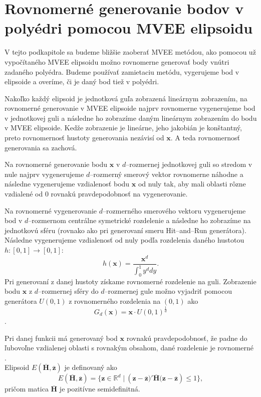 \section {Rovnomerné generovanie bodov v polyédri pomocou MVEE elipsoidu}

V tejto podkapitole sa budeme bližšie zaoberať MVEE metódou, ako pomocou už vypočítaného MVEE elipsoidu možno rovnomerne generovať body vnútri zadaného polyédra. Budeme používať zamietaciu metódu, vygerujeme bod v elipsoide a overíme, či je daný bod tiež v polyédri.

Nakoľko každý elipsoid je jednotková guľa zobrazená lineárnym zobrazením, na rovnomerné generovanie v MVEE elipsoide najprv rovnomerne vygenerujeme bod v jednotkovej guli a následne ho zobrazíme daným lineárnym zobrazením do bodu v MVEE elipsoide. Kedže zobrazenie je lineárne, jeho jakobián je konštantný, preto rovnomernosť hustoty generovania nezávisí od $\mathbf x$. A teda rovnomernosť generovania sa zachová.\\
\label{generovanie_v_mvee}

Na rovnomerné generovanie bodu $\mathbf x$ v $d$--rozmernej jednotkovej guli so stredom v nule najprv vygenerujeme $d$--rozmerný smerový vektor rovnomerne náhodne a následne vygenerujeme vzdialenosť bodu $\mathbf x$ od nuly tak, aby mali oblasti rôzne vzdialené od $0$ rovnakú pravdepodobnosť na vygenerovanie.

Na rovnomerné vygenerovanie $d$--rozmerného smerového vektoru vygenerujeme bod v $d$--rozmernom centrálne symetrické rozdelenie a následne ho zobrazíme na jednotkovú sféru (rovnako ako pri generovaní smeru Hit--and--Run generátora). Následne vygenerujeme vzdialenosť od nuly podľa rozdelenia daného hustotou $h:[0,1] \rightarrow [0,1]$: $$h(\mathbf x)=\frac{\mathbf x^d}{\int_0^1 y^d dy}.$$
Pri generovaní z danej hustoty získame rovnomerné rozdelenie na guli. Zobrazenie bodu $\mathbf x$ z $d$--rozmernej sféry do $d$--rozmernej gule možno vyjadriť pomocou generátora $U(0,1)$ z rovnomerného rozdelenia na $(0,1)$ ako 
$$G_d(\mathbf x)=\mathbf x\cdot U(0,1)^{\frac{1}{d}}$$.

Pri danej funkcii má generovaný bod $\mathbf x$ rovnakú pravdepodobnosť, že padne do ľubovoľne vzdialenej oblasti s rovnakým obsahom, dané rozdelenie je rovnomerné \cite{spheres_harman}.\\

Elipsoid $E(\mathbf{\overline H, \overline z})$ je definovaný ako 
$$E(\mathbf{\overline H, \overline z})= \{ \mathbf{z} \in \mathbb{R}^d \; | \: (\mathbf{z-\overline z)'\overline H(z-\overline z}) \le 1 \}, $$
pričom matica $\mathbf{\overline H}$ je pozitívne semidefinitná.

